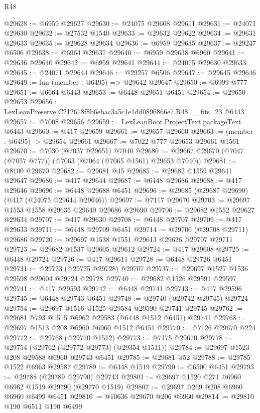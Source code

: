\begin{lexlean}{R48}
\begin{coremodule}
@29628 := @6959 @29627
@29630 := @24075 @29608 @29611
@29631 := @24071 @29630
@29632 := @27532 @1540
@29633 := @29632 @29622
@29634 := @29631 @29633
@29635 := @29628 @29634
@29636 := @6959 @29635
@29637 := @29247 @6506
@29638 := @6964 @29637
@29640 := @6959 @29638 @6960
@29641 := @29636 @29640
@29642 := @6959 @29641
@29644 := @24075 @29630 @29633
@29645 := @24071 @29644
@29646 := @29257 @6506
@29647 := @29645 @29646
@29649 := fun (member : @6495) => @29642 @29647
@29650 := @6999 @777
@29651 := @6664 @6443
@29653 := @6448 @29651 @6451
@29654 := @29650 @29653
@29656 := LexLeanPreserve.C212618f8b6ebac3a5c1e1dd0896866e7.R48.__fits_23 @6443
@29657 := @7008 @29656
@29659 := LexLeanBoot.ProjectText.packageText @6443
@29660 := @417 @29659
@29661 := @29657 @29660
@29663 := (member : @6495) -> @29654 @29661
@29667 := @7022 @777 @29653 @29661 @1561
@29670 := @7030 (@7037 @29651) @7040
@29680 := @29667 @29670 (@7047 (@7057 @777)) (@7063 (@7064 (@7065 @1561) @29653 @7040))
@29681 := @8100 @29670
@29682 := @29681 @45
@29685 := @29682 @1559 @29641 @29647
@29686 := @417 @29644
@29687 := @6448 @29686
@29688 := @417 @29646
@29690 := @6448 @29688 @6451
@29696 := @29685 (@29687 @29690) (@417 (@24075 @29644 @29646))
@29697 := @7117 @29670
@29703 := @29697 @1553 @1558 @29635 @29640 @29686 @29690
@29706 := @29682 @1552 @29627 @29634
@29707 := @417 @29630
@29708 := @6448 @29707
@29709 := @417 @29633
@29711 := @6448 @29709 @6451
@29714 := @29706 (@29708 @29711) @29686
@29720 := @29697 @1538 @1551 @29613 @29626 @29707 @29711
@29723 := @29682 @1537 @29605 @29612
@29724 := @417 @29608
@29725 := @6448 @29724
@29726 := @417 @29611
@29728 := @6448 @29726 @6451
@29731 := @29723 (@29725 @29728) @29707
@29737 := @29697 @1527 @1536 @29598 @29604 @29724 @29728
@29740 := @29682 @1526 @29591 @29597
@29741 := @417 @29593
@29742 := @6448 @29741
@29743 := @417 @29596
@29745 := @6448 @29743 @6451
@29748 := @29740 (@29742 @29745) @29724
@29754 := @29697 @1516 @1525 @29584 @29590 @29741 @29745
@29762 := @29681 @793 @1515 @6962 @29583 (@6448 @1512 @6451) @29741
@29768 := @29697 @1513 @208 @6960 @6960 @1512 @6451
@29770 := @7126 @29670 @224
@29772 := @29768 (@29770 @1512)
@29773 := @7175 @29670
@29778 := @29754 (@29762 (@29772 @29773) (@29354 @1511))
@29784 := @29697 @1523 @208 @29588 @6960 @29743 @6451
@29785 := @29681 @52
@29788 := @29785 @1522 @6963 @29587
@29789 := @6448 @1519
@29790 := @6500 @6451
@29793 := @29788 (@29789 @29790) @29743
@29801 := @29697 @1520 @271 @6960 @6962 @1519 @29790 (@29770 @1519)
@29807 := @29697 @269 @208 @6960 @6960 @6499 @6451
@29810 := @10636 @29670 @206 @6960
@29814 := @29810 @190 @6511 @190 @6499

\end{coremodule}
\end{lexlean}
